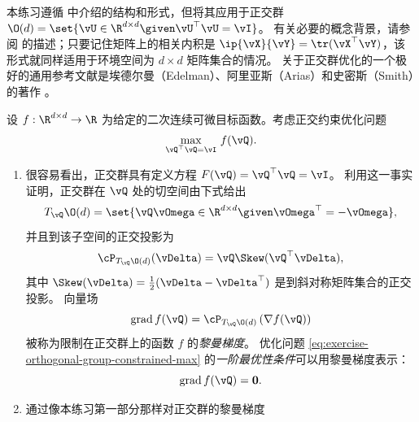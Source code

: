 \documentclass[../../book-main_zh.tex]{subfiles}
\begin{document}
\begin{exercise}\label{exercise:orthogonal-group-calculus}
    本练习遵循  中介绍的结构和形式，但将其应用于正交群 $\O(d)
    = \set{\vU \in \R^{d \times d} \given
    \vU^\top \vU = \vI}$。
    有关必要的概念背景，请参阅  的描述；只要记住矩阵上的相关内积是
    $\ip{\vX}{\vY} = \tr(\vX^\top \vY)$，该形式就同样适用于环境空间为 $d
    \times d$ 矩阵集合的情况。
    关于正交群优化的一个极好的通用参考文献是埃德尔曼（Edelman）、阿里亚斯（Arias）和史密斯（Smith）的著作 \cite{Edelman1998-lg}。

    设 $f : \R^{d\times d} \to \R$ 为给定的二次连续可微目标函数。考虑正交约束优化问题
    \begin{equation}\label{eq:exercise-orthogonal-group-constrained-max}
        \max_{\vQ^\top \vQ = \vI}\, f(\vQ).
    \end{equation}
    \begin{enumerate}
        \item  很容易看出，正交群具有定义方程 $F(\vQ) = \vQ^\top \vQ = \vI$。
            利用这一事实证明，正交群在 $\vQ$ 处的切空间由下式给出
            \begin{equation*}
                T_{\vQ} \O(d) = \set{\vQ \vOmega \in \R^{d\times d}
                \given \vOmega^\top = - \vOmega},
            \end{equation*}
            并且到该子空间的正交投影为
            \begin{equation*}
                \cP_{T_{\vQ}\O(d)}(\vDelta) =  \vQ \Skew(\vQ^\top \vDelta),
            \end{equation*}
            其中 $\Skew(\vDelta) = \tfrac{1}{2} ( \vDelta -
            \vDelta^\top)$ 是到斜对称矩阵集合的正交投影。
            向量场
            \begin{equation}\label{eq:exercise-riemann-grad-orthogonal-group}
                \mathrm{grad}\, f(\vQ) = \cP_{T_{\vQ} \O(d)} \left(
                \nabla f(\vQ) \right)
            \end{equation}
            被称为限制在正交群上的函数 $f$ 的\textit{黎曼梯度}。
            优化问题
            \eqref{eq:exercise-orthogonal-group-constrained-max}
            的\textit{一阶最优性条件}可以用黎曼梯度表示：
            \begin{equation*}
                \mathrm{grad}\, f(\vQ) = \mathbf{0}.
            \end{equation*}
        \item 通过像本练习第一部分那样对正交群的黎曼梯度

\end{enumerate}
\end{exercise}
\end{document}
